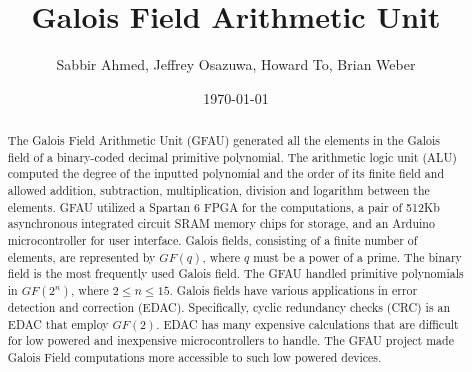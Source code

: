 \documentclass[12pt]{extarticle}
\title{Galois Field Arithmetic Unit}
\author{Sabbir Ahmed, Jeffrey Osazuwa, Howard To, Brian Weber}
\date{\today}
\begin{document}
    \maketitle

    \begin{abstract}

        \large
        The Galois Field Arithmetic Unit (GFAU) generated all the elements in
        the Galois field of a binary-coded decimal primitive polynomial. The
        arithmetic logic unit (ALU) computed the degree of the inputted
        polynomial and the order of its finite field and allowed addition,
        subtraction, multiplication, division and logarithm between the
        elements. GFAU utilized a Spartan 6 FPGA for the computations, a pair
        of 512Kb asynchronous integrated circuit SRAM memory chips for storage,
        and an Arduino microcontroller for user interface. Galois fields,
        consisting of a finite number of elements, are represented by $GF(q)$,
        where $q$ must be a power of a prime. The binary field is the most
        frequently used Galois field. The GFAU handled primitive polynomials in
        $GF(2^n)$, where $2 \le n \le 15$. Galois fields have various
        applications in error detection and correction (EDAC). Specifically,
        cyclic redundancy checks (CRC) is an EDAC that employ $GF(2)$. EDAC has
        many expensive calculations that are difficult for low powered and
        inexpensive microcontrollers to handle. The GFAU project made Galois
        Field computations more accessible to such low powered devices.

    \end{abstract}
\end{document}
